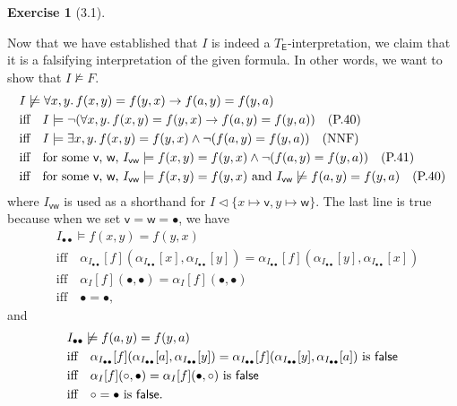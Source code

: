 \documentclass[12pt, psamsfonts]{amsart}
\theoremstyle{definition}
\newtheorem*{exer}{Exercise}
\theoremstyle{remark}
\numberwithin{equation}{subsection}
\begin{document}
\begin{exer}[3.1]
\begin{enumerate}[label=(\alph*)]
            Now that we have established that $I$ is indeed a $T_{\textsf{E}}$-interpretation, we claim that it is a falsifying interpretation of the given formula.
            In other words, we want to show that $I \not\models F$.
            \begin{align*}
                &I \not\models \forall x, y.\, f(x, y) = f(y, x) \rightarrow f(a, y) = f(y, a) \\
                &\text{iff}\quad I \models \neg(\forall x, y.\, f(x, y) = f(y, x) \rightarrow f(a, y) = f(y, a)) \quad\text{(P.40)} \\
                &\text{iff}\quad I \models \exists x, y.\, f(x, y) = f(y, x) \land \neg(f(a, y) = f(y, a)) \quad\text{(NNF)} \\
                &\text{iff}\quad \text{for some \textsf{v}, \textsf{w}, } I_{\textsf{vw}} \models f(x, y) = f(y, x) \land \neg(f(a, y) = f(y, a)) \quad\text{(P.41)} \\
                &\text{iff}\quad \text{for some \textsf{v}, \textsf{w}, } I_{\textsf{vw}} \models f(x, y) = f(y, x) \text{ and } I_{\textsf{vw}} \not\models f(a, y) = f(y, a) \quad\text{(P.40)}
            \end{align*}
            where $I_{\textsf{vw}}$ is used as a shorthand for $I \vartriangleleft \{ x \mapsto \textsf{v}, y \mapsto \textsf{w} \}$.
            The last line is true because when we set $\textsf{v} = \textsf{w} = \bullet$, we have
            \begin{align*}
                & I_{\bullet\bullet} \models f(x, y) = f(y, x) \\
                &\text{iff}\quad \alpha_{I_{\bullet\bullet}}[f](\alpha_{I_{\bullet\bullet}}[x], \alpha_{I_{\bullet\bullet}}[y]) = \alpha_{I_{\bullet\bullet}}[f](\alpha_{I_{\bullet\bullet}}[y], \alpha_{I_{\bullet\bullet}}[x]) \\
                &\text{iff}\quad \alpha_{I}[f](\bullet, \bullet) = \alpha_{I}[f](\bullet, \bullet) \\
                &\text{iff}\quad \bullet = \bullet,
            \end{align*}
            and
            \begin{align*}
                & I_{\bullet\bullet} \not\models f(a, y) = f(y, a) \\
                &\text{iff}\quad \alpha_{I_{\bullet\bullet}}[f](\alpha_{I_{\bullet\bullet}}[a], \alpha_{I_{\bullet\bullet}}[y]) = \alpha_{I_{\bullet\bullet}}[f](\alpha_{I_{\bullet\bullet}}[y], \alpha_{I_{\bullet\bullet}}[a]) \text{ is \textsf{false}}\\
                &\text{iff}\quad \alpha_{I}[f](\circ, \bullet) = \alpha_{I}[f](\bullet, \circ) \text{ is \textsf{false}}\\
                &\text{iff}\quad \circ = \bullet \text{ is \textsf{false}}.
            \end{align*}
    \end{enumerate}
\end{exer}
\end{document}
